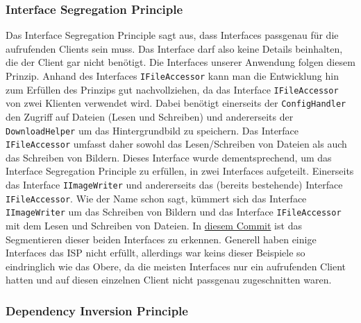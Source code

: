 \subsubsection{Interface Segregation Principle}
Das Interface Segregation Principle sagt aus, dass Interfaces passgenau für die aufrufenden Clients sein muss. Das Interface darf also keine Details beinhalten, die der Client gar nicht benötigt.
Die Interfaces unserer Anwendung folgen diesem Prinzip. Anhand des Interfaces \texttt{IFileAccessor} kann man die Entwicklung hin zum Erfüllen des Prinzips gut nachvollziehen, da das Interface \texttt{IFileAccessor} von zwei Klienten verwendet wird. Dabei benötigt einerseits der \texttt{ConfigHandler} den Zugriff auf Dateien (Lesen und Schreiben) und andererseits der \texttt{DownloadHelper} um das Hintergrundbild zu speichern. Das Interface \texttt{IFileAccessor} umfasst daher sowohl das Lesen/Schreiben von Dateien als auch das Schreiben von Bildern. Dieses Interface wurde dementsprechend, um das Interface Segregation Principle zu erfüllen, in zwei Interfaces aufgeteilt. Einerseits das Interface \texttt{IImageWriter} und andererseits das (bereits bestehende) Interface \texttt{IFileAccessor}. Wie der Name schon sagt, kümmert sich das Interface \texttt{IImageWriter} um das Schreiben von Bildern und das Interface \texttt{IFileAccessor} mit dem Lesen und Schreiben von Dateien. In \href{https://github.com/Bronzila/WeatherWallpaper/commit/8db38466c2185e16ef90f71af485e00b57b09032}{\color{blue}diesem Commit} ist das Segmentieren dieser beiden Interfaces zu erkennen.
Generell haben einige Interfaces das ISP nicht erfüllt, allerdings war keins dieser Beispiele so eindringlich wie das Obere, da die meisten Interfaces nur ein aufrufenden Client hatten und auf diesen einzelnen Client nicht passgenau zugeschnitten waren.
\subsubsection{Dependency Inversion Principle}
\label{sec:dependency_inversion}

